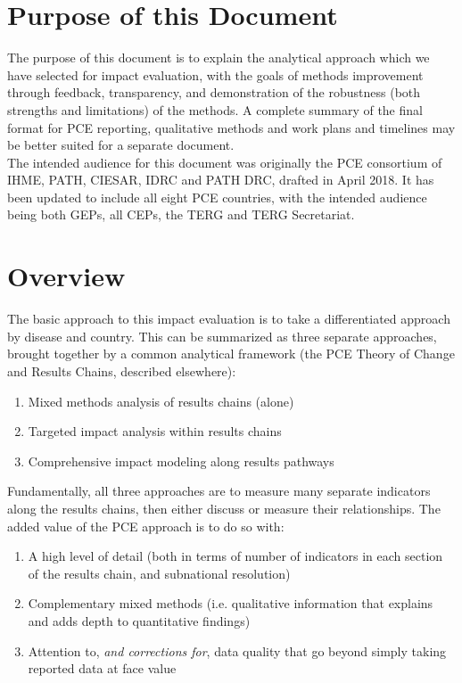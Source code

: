 \documentclass[twocolumn]{bmcart}%
\begin{document}

\section{Purpose of this Document}
The purpose of this document is to explain the analytical approach which we have selected for impact evaluation, with the goals of methods improvement through feedback, transparency, and demonstration of the robustness (both strengths and limitations) of the methods. A complete summary of the final format for PCE reporting, qualitative methods and work plans and timelines may be better suited for a separate document. \\

The intended audience for this document was originally the PCE consortium of IHME, PATH, CIESAR, IDRC and PATH DRC, drafted in April 2018. It has been updated to include all eight PCE countries, with the intended audience being both GEPs, all CEPs, the TERG and TERG Secretariat.


\section{Overview}
The basic approach to this impact evaluation is to take a differentiated approach by disease and country. This can be summarized as three separate approaches, brought together by a common analytical framework (the PCE Theory of Change and Results Chains, described elsewhere):

\begin{enumerate}
  \item Mixed methods analysis of results chains (alone)
  \item Targeted impact analysis within results chains
  \item Comprehensive impact modeling along results pathways
\end{enumerate}
\smallskip

Fundamentally, all three approaches are to measure many separate indicators along the results chains, then either discuss or measure their relationships. The added value of the PCE approach is to do so with:
\begin{enumerate}
  \item A high level of detail (both in terms of number of indicators in each section of the results chain, and subnational resolution)
  \item Complementary mixed methods (i.e. qualitative information that explains and adds depth to quantitative findings)
  \item Attention to, \textit{and corrections for}, data quality that go beyond simply taking reported data at face value
\end{enumerate}
\smallskip
\end{document}
